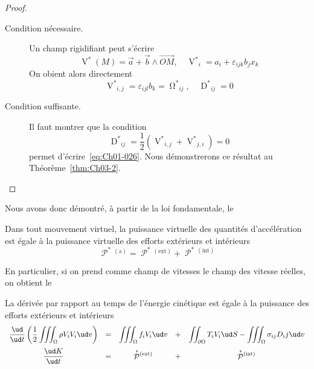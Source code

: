 \begin{proof}\textcolor{white}{plo}
    \begin{description}
        \item[Condition nécessaire.] Un champ rigidifiant peut s'écrire 
            \begin{equation}
                \mathop{V}^{\ast}(M) = \vec{a} + \vec{b} \wedge \vec{OM},\quad {\mathop{V}^{\ast}}_i = a_i + \varepsilon_{ijk} b_j x_k
                \label{eq:Ch01-026}
            \end{equation}
            On obient alors directement
            \begin{displaymath}
                {\mathop{V}^{\ast}}_{i,j} = \varepsilon_{ijl}b_k = {\mathop{\Omega}^{\ast}}_{ij},\quad {\mathop{D}^{\ast}}_{ij} = 0
            \end{displaymath}
        \item[Condition suffisante.] Il faut montrer que la condition
            \begin{equation}
                {\mathop{D}^{\ast}}_{ij} = \frac{1}{2} \left( {\mathop{V}^{\ast}}_{i,j} + {\mathop{V}^{\ast}}_{j,i} \right) = 0
                \label{eq:Ch01-027}
            \end{equation}
            permet d'écrire~\eqref{eq:Ch01-026}.
            Nous démonstrerons ce résultat au Théorème~\ref{thm:Ch03-2}.
    \end{description}
\end{proof}

Nous avons donc démontré, à partir de la loi fondamentale, le

\begin{thmn}
    Dans tout mouvement virtuel, la puissance virtuelle des quantités d'accélération est égale à la puissance virtuelle des efforts extérieurs et intérieurs
    \begin{equation}
        \mathop{\mathcal{P}}^{\ast}{\!}^{(\text{a})} = \mathop{\mathcal{P}}^{\ast}{\!}^{(\text{ext})} + \mathop{\mathcal{P}}^{\ast}{\!}^{(\text{int})}
        \label{eq:Ch01-028}
    \end{equation}
\end{thmn}

En particulier, si on prend comme champ de vitesses le champ des vitesse réelles, on obtient le

\begin{thmn}
    La dérivée par rapport au temps de l'énergie cinétique est égale à la puissance des efforts extérieurs et intérieurs
\begin{equation}
\everymath{\displaystyle} 
    \begin{array}{ccccc}
        \frac{\ud}{\ud t}\left( \frac{1}{2}\iiint_{\Omega} \rho V_iV_i \ud v\right) &=& \iiint_{\Omega} f_i V_i \ud v &+& \iint_{\partial\Omega} T_i V_i \ud S - \iiint_{\Omega} \sigma_{ij} D_ij \ud v\\[12pt]
        \frac{\ud K}{\ud t}  &=& \mathop{\mathcal{P}}^{\ast}{\!}^{(\text{ext})} &+& \mathop{\mathcal{P}}^{\ast}{\!}^{(\text{int})}
    \end{array}
       \label{eq:Ch01-029}
\end{equation}
\end{thmn}
